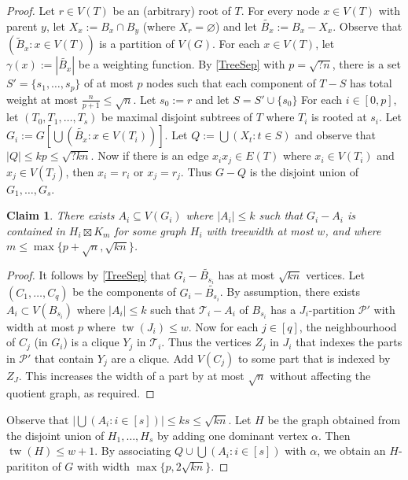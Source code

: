 \documentclass[12pt]{article}
\renewcommand{\emptyset}{\varnothing}
\renewcommand{\leq}{\leqslant}
\DeclareMathOperator{\tw}{tw}
\newcommand{\PP}{\mathcal{P}}
\theoremstyle{plain}
\newtheorem*{claim}{Claim}
\theoremstyle{definition}
\begin{document}
\begin{proof}
    Let $r\in V(T)$ be an (arbitrary) root of $T$. For every node $x\in V(T)$ with parent $y$, let $X_x:=B_x\cap B_y$ (where $X_r=\emptyset$) and let $\tilde{B_x}:=B_x-X_x$. Observe that $(\tilde{B}_x \colon x \in V(T))$ is a partition of $V(G)$. For each $x\in V(T)$, let $\gamma(x):=|\tilde{B_{x}}|$ be a weighting function. By \cref{TreeSep} with $p=\sqrt{?n}$, there is a set $S'=\{s_1,\dots,s_p\}$ of at most $p$ nodes such that each component of $T-S$ has total weight at most $\frac{n}{p+1}\leq \sqrt{n}$. Let $s_0:=r$ and let $S=S'\cup \{s_0\}$ For each $i\in [0,p]$, let $(T_0,T_1,\dots,T_s)$ be maximal disjoint subtrees of $T$ where $T_i$ is rooted at $s_i$. Let $G_i:=G[\bigcup(\tilde{B_x}: x \in V(T_i))]$. Let $Q:= \bigcup (X_{t}: t \in S)$ and observe that $|Q|\leq kp \leq \sqrt{?kn}$. Now if there is an edge $x_ix_j\in E(T)$ where $x_i\in V(T_i)$ and $x_j\in V(T_j)$, then $x_i=r_i$ or $x_j=r_j$. Thus $G-Q$ is the disjoint union of $G_1,\dots,G_s$.
    
    \begin{claim}
        There exists $A_i\subseteq V(G_i)$ where $|A_i|\leq k$ such that $G_i-A_i$ is contained in $H_i\boxtimes K_m$ for some graph $H_i$ with treewidth at most $w$, and where $m\leq\max\{p+\sqrt{n},\sqrt{kn}\}$.
    \end{claim}
    \begin{proof}
        It follows by \cref{TreeSep} that $G_i-\tilde{B_{s_i}}$ has at most $\sqrt{kn}$ vertices. Let $(C_1,\dots, C_q)$ be the components of $G_i-\tilde{B_{s_i}}$. By assumption, there exists $A_i\subset V(B_{s_i})$ where $|A_i|\leq k$ such that $\mathcal{T}_i-A_i$ of $B_{s_i}$ has a $J_i$-partition $\PP'$ with width at most $p$ where $\tw(J_i)\leq w$. Now for each $j\in [q]$, the neighbourhood of $C_j$ (in $G_i$) is a clique $Y_j$ in $\mathcal{T}_i$.  Thus the vertices $Z_j$ in $J_i$ that indexes the parts in $\PP'$ that contain $Y_j$ are a clique. Add $V(C_j)$ to some part that is indexed by $Z_J$. This increases the width of a part by at most $\sqrt{n}$ without affecting the quotient graph, as required.
    \end{proof}
    Observe that $|\bigcup (A_i: i \in [s])|\leq ks\leq \sqrt{kn}$.
    Let $H$ be the graph obtained from the disjoint union of $H_1,\dots, H_s$ by adding one dominant vertex $\alpha$. Then $\tw(H)\leq w+1$. By associating $Q\cup \bigcup (A_i: i \in [s])$ with $\alpha$, we obtain an $H$-parititon of $G$ with width $\max\{p,2\sqrt{kn}\}$.
\end{proof}
    
\end{document}
